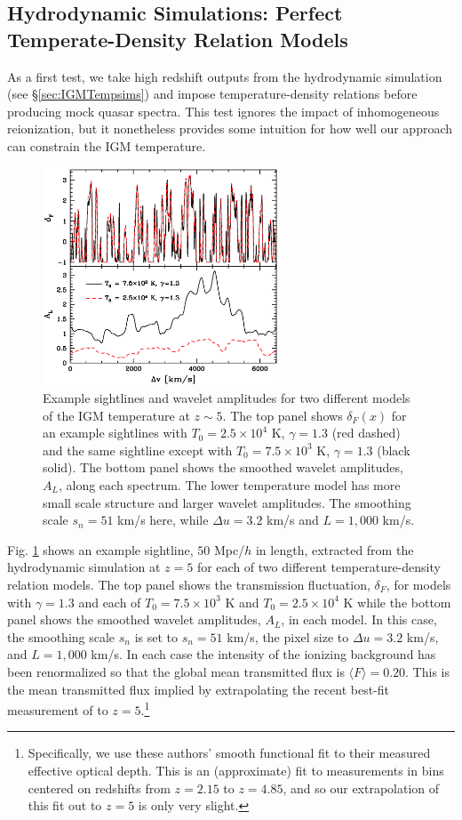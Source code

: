\subsection{Hydrodynamic Simulations: Perfect Temperate-Density Relation Models}

As a first test, we take high redshift outputs from the hydrodynamic simulation (see \S \ref{sec:IGMTempsims}) and impose temperature-density relations
before producing mock quasar spectra. This test ignores the impact of inhomogeneous reionization, but it nonetheless provides
some intuition for how well our approach can constrain the IGM temperature.

\begin{figure}
\bc
\includegraphics[width=7cm]{f10.eps}
\caption{Example sightlines and wavelet amplitudes for two different models of the IGM temperature at $z \sim 5$.
The top panel shows $\delta_F(x)$ for an example sightlines with $T_0 = 2.5 \times 10^4$ K, $\gamma=1.3$ (red dashed) and the same sightline except with $T_0 = 7.5 \times
10^3$ K, $\gamma=1.3$ (black solid). The bottom panel shows the smoothed wavelet amplitudes, $A_L$, along each spectrum.
The lower temperature model has more small scale structure and larger wavelet amplitudes. The smoothing scale $s_n=51$ km/s here, while
$\Delta u = 3.2$ km/s and $L=1,000$ km/s.}
\label{fig:examp_sightlines}
\ec
\end{figure}

Fig. \ref{fig:examp_sightlines} shows an example sightline, $50$ Mpc/$h$ in length, extracted from the hydrodynamic simulation at $z=5$
for each of two different temperature-density relation models. The top panel shows the transmission fluctuation, $\delta_F$, for
models with $\gamma=1.3$ and each of $T_0 = 7.5 \times 10^3$ K and $T_0 = 2.5 \times 10^4$ K while the bottom panel shows the
smoothed wavelet amplitudes, $A_L$, in each model. In this case, the smoothing scale $s_n$ is set to $s_n=51$ km/s, the pixel
size to $\Delta u = 3.2$ km/s, and $L=1,000$ km/s. 
In each case the intensity of the ionizing background has been renormalized
so that the global mean transmitted flux is $\langle F \rangle=0.20$. This is the mean transmitted flux implied by extrapolating 
the recent best-fit measurement of \citet{Becker:2012aq} to $z=5$.\footnote{Specifically, we use these authors' smooth functional fit to their measured effective optical
depth. This is an (approximate) fit to measurements in bins centered on redshifts from $z=2.15$ to $z=4.85$, and so our extrapolation of
this fit out to $z=5$ is only very slight.}


